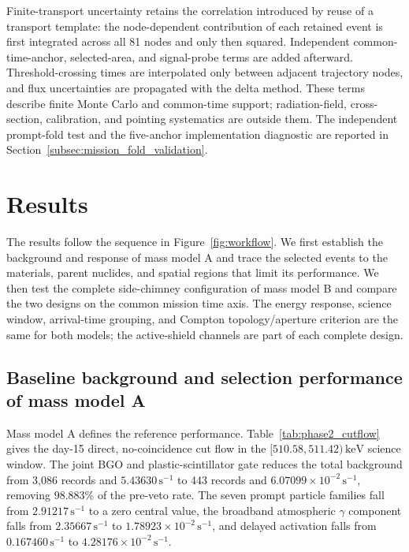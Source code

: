 \documentclass[11pt]{article}
\newcommand{\keV}{\ensuremath{\,\mathrm{keV}}}
\newcommand{\cps}{\ensuremath{\,\mathrm{s^{-1}}}}
\begin{document}
Finite-transport uncertainty retains the correlation introduced by reuse of a
transport template: the node-dependent contribution of each retained event is
first integrated across all 81 nodes and only then squared. Independent
common-time-anchor, selected-area, and signal-probe terms are added afterward.
Threshold-crossing times are interpolated only between adjacent trajectory
nodes, and flux uncertainties are propagated with the delta method. These terms
describe finite Monte Carlo and common-time support; radiation-field,
cross-section, calibration, and pointing systematics are outside them. The
independent prompt-fold test and the five-anchor implementation diagnostic are
reported in Section~\ref{subsec:mission_fold_validation}.

\section{Results}
\label{sec:results}

The results follow the sequence in Figure~\ref{fig:workflow}. We first establish the background and response of mass model A and trace the selected events to the materials, parent nuclides, and spatial regions that limit its performance. We then test the complete side-chimney configuration of mass model B and compare the two designs on the common mission time axis. The energy response, science window, arrival-time grouping, and Compton topology/aperture criterion are the same for both models; the active-shield channels are part of each complete design.

\subsection{Baseline background and selection performance of mass model A}
\label{subsec:model_a_baseline}
\label{subsec:reference_background_results}

Mass model A defines the reference performance. Table~\ref{tab:phase2_cutflow} gives the day-15 direct, no-coincidence cut flow in the $[510.58,511.42)\keV$ science window. The joint BGO and plastic-scintillator gate reduces the total background from 3,086 records and $5.43630\cps$ to 443 records and $6.07099\times10^{-2}\cps$, removing 98.883\% of the pre-veto rate. The seven prompt particle families fall from $2.91217\cps$ to a zero central value, the broadband atmospheric $\gamma$ component falls from $2.35667\cps$ to $1.78923\times10^{-2}\cps$, and delayed activation falls from $0.167460\cps$ to $4.28176\times10^{-2}\cps$.
\end{document}
